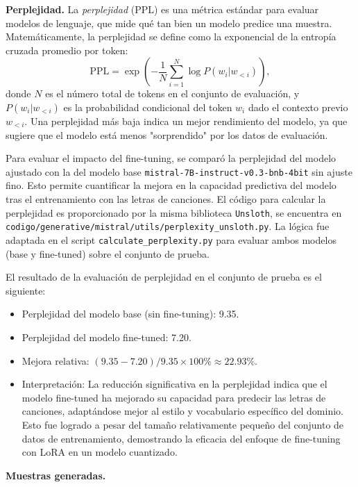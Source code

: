 \documentclass[paper=letter, fontsize=11pt, draft=false]{scrartcl}
\numberwithin{equation}{section} %
\numberwithin{figure}{section} %
\numberwithin{table}{section} %
\numberwithin{subsection}{section}
\begin{document}
\textbf{Perplejidad.} La \emph{perplejidad} (PPL) es una métrica estándar para evaluar modelos de lenguaje, que mide qué tan bien un modelo predice una muestra. Matemáticamente, la perplejidad se define como la exponencial de la entropía cruzada promedio por token:
\[
\text{PPL} = \exp\left(-\frac{1}{N} \sum_{i=1}^{N} \log P(w_i | w_{<i})\right),
\]
donde \(N\) es el número total de tokens en el conjunto de evaluación, y \(P(w_i | w_{<i})\) es la probabilidad condicional del token \(w_i\) dado el contexto previo \(w_{<i}\). Una perplejidad más baja indica un mejor rendimiento del modelo, ya que sugiere que el modelo está menos "sorprendido" por los datos de evaluación.

Para evaluar el impacto del fine-tuning, se comparó la perplejidad del modelo ajustado con la del modelo base \texttt{mistral-7B-instruct-v0.3-bnb-4bit} sin ajuste fino. Esto permite cuantificar la mejora en la capacidad predictiva del modelo tras el entrenamiento con las letras de canciones. El código para calcular la perplejidad es proporcionado por la misma biblioteca \texttt{Unsloth}, se encuentra en \texttt{codigo/generative/mistral/utils/perplexity\_unsloth.py}. La lógica fue adaptada en el script \texttt{calculate\_perplexity.py} para evaluar ambos modelos (base y fine-tuned) sobre el conjunto de prueba.

El resultado de la evaluación de perplejidad en el conjunto de prueba es el siguiente:
\begin{itemize}
    \item Perplejidad del modelo base (sin fine-tuning): 9.35.
    \item Perplejidad del modelo fine-tuned: 7.20.
    \item Mejora relativa: \((9.35 - 7.20) / 9.35 \times 100\% \approx 22.93\%\).
    \item Interpretación: La reducción significativa en la perplejidad indica que el modelo fine-tuned ha mejorado su capacidad para predecir las letras de canciones, adaptándose mejor al estilo y vocabulario específico del dominio. Esto fue logrado a pesar del tamaño relativamente pequeño del conjunto de datos de entrenamiento, demostrando la eficacia del enfoque de fine-tuning con LoRA en un modelo cuantizado.
\end{itemize}

\textbf{Muestras generadas.} 
\end{document}
